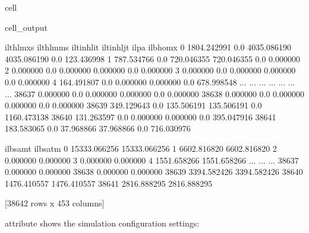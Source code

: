 \documentclass[letterpaper,10pt,english]{sphinxmanual}
\begin{document}
\begin{sphinxuseclass}{cell}
\begin{sphinxuseclass}{cell_output}
\begin{sphinxVerbatim}[commandchars=\\\{\}]
        il\PYGZus{}thlmx\PYGZus{}s  il\PYGZus{}thlmm\PYGZus{}s   il\PYGZus{}tinhlit   il\PYGZus{}tinhljt  il\PYGZus{}pa     il\PYGZus{}bhomx  \PYGZbs{}
0      1804.242991         0.0  4035.086190  4035.086190    0.0   123.436998   
1       787.534766         0.0   720.046355   720.046355    0.0     0.000000   
2         0.000000         0.0     0.000000     0.000000    0.0     0.000000   
3         0.000000         0.0     0.000000     0.000000    0.0     0.000000   
4       164.491807         0.0     0.000000     0.000000    0.0   678.998548   
...            ...         ...          ...          ...    ...          ...   
38637     0.000000         0.0     0.000000     0.000000    0.0     0.000000   
38638     0.000000         0.0     0.000000     0.000000    0.0     0.000000   
38639   349.129643         0.0   135.506191   135.506191    0.0  1160.473138   
38640   131.263597         0.0     0.000000     0.000000    0.0   395.047916   
38641   183.583065         0.0    37.968866    37.968866    0.0   716.030976   

           il\PYGZus{}bsamt      il\PYGZus{}bsatm  
0      15333.066256  15333.066256  
1       6602.816820   6602.816820  
2          0.000000      0.000000  
3          0.000000      0.000000  
4       1551.658266   1551.658266  
...             ...           ...  
38637      0.000000      0.000000  
38638      0.000000      0.000000  
38639   3394.582426   3394.582426  
38640   1476.410557   1476.410557  
38641   2816.888295   2816.888295  

[38642 rows x 453 columns]
\end{sphinxVerbatim}

\end{sphinxuseclass}
\end{sphinxuseclass}
\sphinxAtStartPar
{} attribute shows the simulation configuration settings:
\end{document}

